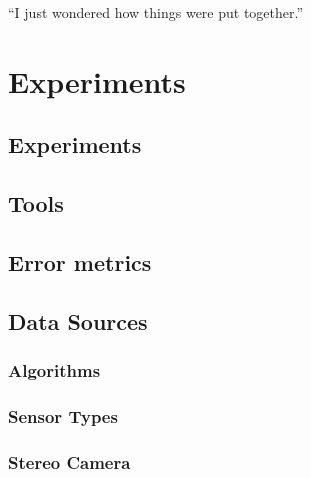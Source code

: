 \begin{savequote}[8cm]
  ``I just wondered how things were put together.''
\end{savequote}
\makeatletter
\chapter{Experiments}
\label{ch:Experiments}

\section{Experiments}



%

\section{Tools}
\label{ToolsSection}


\section{Error metrics}
\label{metricsSection}


\section{Data Sources}
\label{Sec:FVRSOTA}
\subsection{Algorithms} 
\label{AlgorithmsSection}


\subsection{Sensor Types} 
\label{SensorTypesExpsSection}


\subsection{Stereo Camera}
\label{StereoSOTA}


